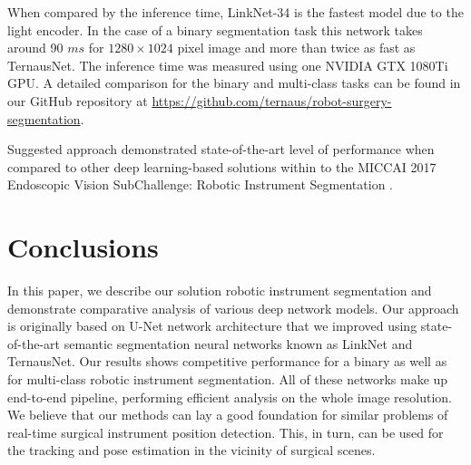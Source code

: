 \documentclass[runningheads,a4paper]{llncs}[2015/06/24]
\begin{document}
When compared by the inference time, LinkNet-34 is the fastest model due to the light encoder. In the case of a binary segmentation task this network takes around 90 $ms$ for $1280\times1024$ pixel image and more than twice as fast as TernausNet. The inference time was measured using one NVIDIA GTX 1080Ti GPU. A detailed comparison for the binary and multi-class tasks can be found in our GitHub repository at \url{https://github.com/ternaus/robot-surgery-segmentation}.

Suggested approach demonstrated state-of-the-art level of performance when compared to other deep learning-based solutions within to the MICCAI 2017 Endoscopic Vision SubChallenge: Robotic Instrument Segmentation \cite{miccai2017}.

\section{Conclusions}
In this paper, we describe our solution robotic instrument segmentation and demonstrate comparative analysis of various deep network models. Our approach is originally based on U-Net network architecture that we improved using state-of-the-art semantic segmentation neural networks known as LinkNet and TernausNet. Our results shows competitive performance for a binary as well as for multi-class robotic instrument segmentation. All of these networks make up end-to-end pipeline, performing efficient analysis on the whole image resolution. We believe that our methods can lay a good foundation for similar problems of real-time surgical instrument position detection. This, in turn, can be used for the tracking and pose estimation in the vicinity of surgical scenes.    


%



\end{document}
